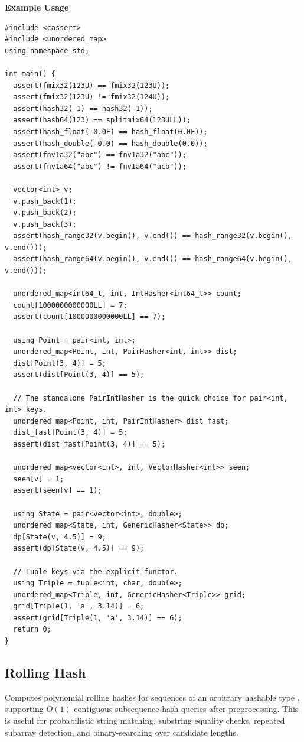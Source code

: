 \textbf{Example Usage}\par
\begin{lstlisting}[style=cpp]
#include <cassert>
#include <unordered_map>
using namespace std;

int main() {
  assert(fmix32(123U) == fmix32(123U));
  assert(fmix32(123U) != fmix32(124U));
  assert(hash32(-1) == hash32(-1));
  assert(hash64(123) == splitmix64(123ULL));
  assert(hash_float(-0.0F) == hash_float(0.0F));
  assert(hash_double(-0.0) == hash_double(0.0));
  assert(fnv1a32("abc") == fnv1a32("abc"));
  assert(fnv1a64("abc") != fnv1a64("acb"));

  vector<int> v;
  v.push_back(1);
  v.push_back(2);
  v.push_back(3);
  assert(hash_range32(v.begin(), v.end()) == hash_range32(v.begin(), v.end()));
  assert(hash_range64(v.begin(), v.end()) == hash_range64(v.begin(), v.end()));

  unordered_map<int64_t, int, IntHasher<int64_t>> count;
  count[1000000000000LL] = 7;
  assert(count[1000000000000LL] == 7);

  using Point = pair<int, int>;
  unordered_map<Point, int, PairHasher<int, int>> dist;
  dist[Point(3, 4)] = 5;
  assert(dist[Point(3, 4)] == 5);

  // The standalone PairIntHasher is the quick choice for pair<int, int> keys.
  unordered_map<Point, int, PairIntHasher> dist_fast;
  dist_fast[Point(3, 4)] = 5;
  assert(dist_fast[Point(3, 4)] == 5);

  unordered_map<vector<int>, int, VectorHasher<int>> seen;
  seen[v] = 1;
  assert(seen[v] == 1);

  using State = pair<vector<int>, double>;
  unordered_map<State, int, GenericHasher<State>> dp;
  dp[State(v, 4.5)] = 9;
  assert(dp[State(v, 4.5)] == 9);

  // Tuple keys via the explicit functor.
  using Triple = tuple<int, char, double>;
  unordered_map<Triple, int, GenericHasher<Triple>> grid;
  grid[Triple(1, 'a', 3.14)] = 6;
  assert(grid[Triple(1, 'a', 3.14)] == 6);
  return 0;
}
\end{lstlisting}
\subsection{Rolling Hash}
\label{sec:3.2.2}
Computes polynomial rolling hashes for sequences of an arbitrary hashable type , supporting $O(1)$ contiguous subsequence hash queries after preprocessing. This is useful for probabilistic string matching, substring equality checks, repeated subarray detection, and binary-searching over candidate lengths.

